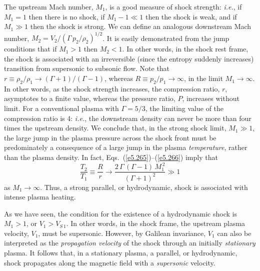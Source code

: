 The upstream Mach number, $M_1$, is a good measure of shock strength:
{\em i.e.}, if $M_1=1$ then there is no shock, if $M_1-1 \ll 1$ then the shock is
weak, and if $M_1\gg 1$ then  the shock is strong. We can define an analogous downstream Mach number, $M_2=V_2/(\Gamma\,p_2/\rho_2)^{1/2}$. 
It is easily demonstrated from  the jump conditions that if $M_1>1$ then $M_2 < 1$. In other
words, in the shock rest frame, the shock is associated with an irreversible (since the
entropy suddenly increases) transition from supersonic to subsonic flow. Note that $r\equiv \rho_2/\rho_1\rightarrow (\Gamma+1)/(\Gamma-1)$,
whereas $R\equiv p_2/p_1\rightarrow\infty$, in the limit $M_1\rightarrow \infty$. In other words, as the shock strength increases, the compression ratio, $r$,
asymptotes to a finite value,  whereas the
pressure ratio, $P$, increases without limit. For a conventional
plasma with $\Gamma=5/3$, the limiting value of the compression ratio is 4: {\em i.e.}, the downstream density can never be more than four times the upstream density. We conclude that, in the strong shock limit, 
$M_1 \gg 1$, the
large jump in  the plasma pressure across the shock front must be
predominately  a consequence of a large jump in  the plasma {\em temperature}, rather than  the plasma density. In fact,  Eqs.~(\ref{e5.265})--(\ref{e5.266}) imply that
\begin{equation}
\frac{T_2}{T_1} \equiv \frac{R}{r}\rightarrow \frac{2\,\Gamma\,(\Gamma-1)\,M_1^{\,2}}{(\Gamma+1)^2}\gg 1
\end{equation}
as $M_1\rightarrow\infty$. Thus, a strong parallel, or hydrodynamic, shock
is associated with intense plasma heating.

As we have seen, the condition for the existence of a hydrodynamic
shock is $M_1> 1$, or $V_1 > V_{S\,1}$. In other words, in the
shock frame, the upstream plasma velocity, $V_1$, must be supersonic. 
However, by Galilean invariance, $V_1$ can also be interpreted as the
 {\em propagation velocity}\/ of the shock through an initially {\em stationary}\/ plasma. It follows that, in a stationary plasma, 
a parallel, or hydrodynamic, shock propagates along the magnetic field with a {\em supersonic}\/ velocity. 

